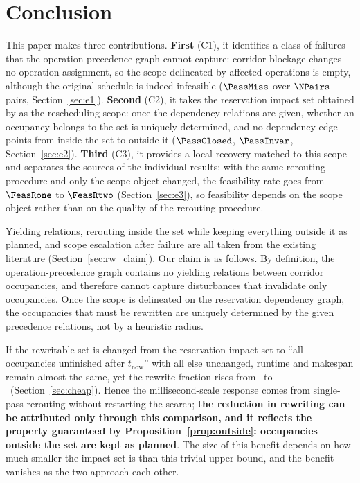 \section{Conclusion}
\label{sec:conclusion}

This paper makes three contributions. \textbf{First} (C1), it identifies a class of failures that the operation-precedence graph cannot capture: corridor blockage changes no operation assignment,
so the scope delineated by affected operations is empty, although the original schedule is indeed infeasible (\(\PassMiss\) over \(\NPairs\) pairs, Section~\ref{sec:e1}).
\textbf{Second} (C2), it takes the reservation impact set obtained by \STRC as the rescheduling scope: once the dependency relations are given, whether an occupancy belongs to the set is
uniquely determined, and no dependency edge points from inside the set to outside it (\(\PassClosed\), \(\PassInvar\), Section~\ref{sec:e2}).
\textbf{Third} (C3), it provides a local recovery matched to this scope and separates the sources of the individual results: with the same rerouting procedure and only the scope object changed,
the feasibility rate goes from \(\FeasRone\) to \(\FeasRtwo\) (Section~\ref{sec:e3}),
so feasibility depends on the scope object rather than on the quality of the rerouting procedure.

Yielding relations, rerouting inside the set while keeping everything outside it as planned, and scope escalation after failure are all taken from the existing literature
(Section~\ref{sec:rw_claim}). Our claim is as follows.
By definition, the operation-precedence graph contains no yielding relations between corridor occupancies, and therefore cannot capture disturbances that invalidate only occupancies.
Once the scope is delineated on the reservation dependency graph, the occupancies that must be rewritten are uniquely determined by the given precedence relations, not by a heuristic radius.

If the rewritable set is changed from the reservation impact set to ``all occupancies unfinished after \(t_{\mathrm{now}}\)''
with all else unchanged, runtime and makespan remain almost the same, yet the rewrite fraction rises from \ResFracCheapRtwo\ to
\ResFracAllFuture\ (Section~\ref{sec:cheap}).
Hence the millisecond-scale response comes from single-pass rerouting without restarting the search; \textbf{the reduction in rewriting can be attributed only through this comparison,
and it reflects the property guaranteed by Proposition~\ref{prop:outside}: occupancies outside the set are kept as planned}.
The size of this benefit depends on how much smaller the impact set is than this trivial upper bound, and the benefit vanishes as the two approach each other.

